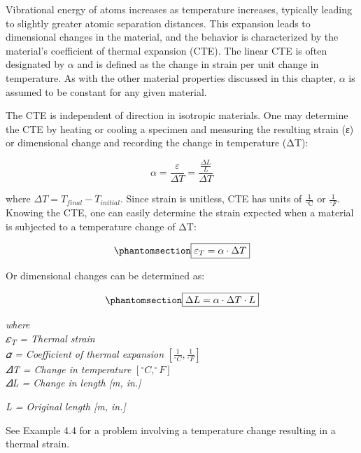 \documentclass[
  letterpaper,
  DIV=11,
  numbers=noendperiod]{scrreprt}
\theoremstyle{definition}
\theoremstyle{remark}
\begin{document}
Vibrational energy of atoms increases as temperature increases,
typically leading to slightly greater atomic separation distances. This
expansion leads to dimensional changes in the material, and the behavior
is characterized by the material's coefficient of thermal expansion
(CTE). The linear CTE is often designated by \(\alpha\) and is defined
as the change in strain per unit change in temperature. As with the
other material properties discussed in this chapter, \(\alpha\) is
assumed to be constant for any given material.

The CTE is independent of direction in isotropic materials. One may
determine the CTE by heating or cooling a specimen and measuring the
resulting strain (ε) or dimensional change and recording the change in
temperature (ΔT):

\[
\alpha=\frac{\varepsilon}{\Delta T}=\frac{\frac{\Delta L}{L}}{\Delta T}
\]

where \(\Delta T=T_{final}-T_{initial}\). Since strain is unitless, CTE
has units of \(\frac{1}{{ }^{\circ} \mathrm{C}}\) or
\(\frac{1}{{ }^{\circ} F}\). Knowing the CTE, one can easily determine
the strain expected when a material is subjected to a temperature change
of ΔT:

\begin{equation}\phantomsection\label{eq-4.5}{
\boxed{\varepsilon_T=\alpha \cdot \Delta T}
}\end{equation}

Or dimensional changes can be determined as:

\begin{equation}\phantomsection\label{eq-4.6}{
\boxed{\Delta L=\alpha \cdot \Delta T \cdot L}
}\end{equation}

\emph{where}\\
\emph{𝜀\textsubscript{T} = Thermal strain}\\
\emph{𝛼 = Coefficient of thermal expansion}
\(\left[\frac{1}{^\circ C},\frac{1}{^\circ F}\right]\)\\
\emph{𝛥T = Change in temperature} \([^\circ C, ^\circ F]\)\\
\emph{𝛥L = Change in length {[}m, in.{]}}

\emph{L = Original length {[}m, in.{]}}

See Example 4.4 for a problem involving a temperature change resulting
in a thermal strain.
\end{document}
